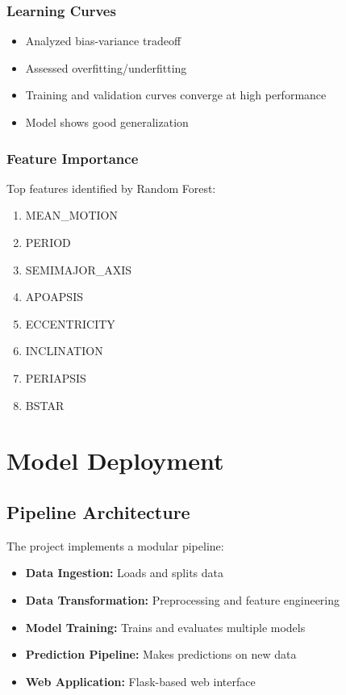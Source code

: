 \documentclass[12pt,a4paper]{article}
\begin{document}
\subsubsection{Learning Curves}
\begin{itemize}
    \item Analyzed bias-variance tradeoff
    \item Assessed overfitting/underfitting
    \item Training and validation curves converge at high performance
    \item Model shows good generalization
\end{itemize}

\subsubsection{Feature Importance}
Top features identified by Random Forest:
\begin{enumerate}
    \item MEAN\_MOTION
    \item PERIOD
    \item SEMIMAJOR\_AXIS
    \item APOAPSIS
    \item ECCENTRICITY
    \item INCLINATION
    \item PERIAPSIS
    \item BSTAR
\end{enumerate}

\section{Model Deployment}

\subsection{Pipeline Architecture}
The project implements a modular pipeline:

\begin{itemize}
    \item \textbf{Data Ingestion:} Loads and splits data
    \item \textbf{Data Transformation:} Preprocessing and feature engineering
    \item \textbf{Model Training:} Trains and evaluates multiple models
    \item \textbf{Prediction Pipeline:} Makes predictions on new data
    \item \textbf{Web Application:} Flask-based web interface
\end{itemize}
\end{document}
